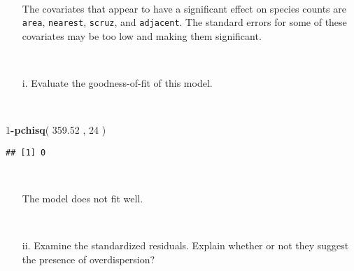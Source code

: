\documentclass[]{article}
\newenvironment{Shaded}{\begin{snugshade}}{\end{snugshade}}
\newcommand{\KeywordTok}[1]{\textcolor[rgb]{0.13,0.29,0.53}{\textbf{#1}}}
\newcommand{\DataTypeTok}[1]{\textcolor[rgb]{0.13,0.29,0.53}{#1}}
\newcommand{\DecValTok}[1]{\textcolor[rgb]{0.00,0.00,0.81}{#1}}
\newcommand{\FloatTok}[1]{\textcolor[rgb]{0.00,0.00,0.81}{#1}}
\newcommand{\StringTok}[1]{\textcolor[rgb]{0.31,0.60,0.02}{#1}}
\newcommand{\OperatorTok}[1]{\textcolor[rgb]{0.81,0.36,0.00}{\textbf{#1}}}
\newcommand{\NormalTok}[1]{#1}
\begin{document}
~

\begin{itemize}   
\item[] The covariates that appear to have a significant effect on species counts are {\tt area}, {\tt nearest}, {\tt scruz}, and {\tt adjacent}. The standard errors for some of these covariates may be too low and making them significant.
\end{itemize}

~

\begin{itemize}   
\item[i.] Evaluate the goodness-of-fit of this model.
\end{itemize}

~

\begin{Shaded}
\begin{Highlighting}[]
\DecValTok{1}\OperatorTok{-}\KeywordTok{pchisq}\NormalTok{( }\FloatTok{359.52}\NormalTok{  , }\DecValTok{24}\NormalTok{  )}
\end{Highlighting}
\end{Shaded}

\begin{verbatim}
## [1] 0
\end{verbatim}

~

\begin{itemize}   
\item[] The model does not fit well.
\end{itemize}

~

\begin{itemize}  
\item[ii.] Examine the standardized residuals. Explain whether or not they suggest the presence of overdispersion? 
\end{itemize}

~

\begin{Shaded}
\end{Shaded}
\end{document}
